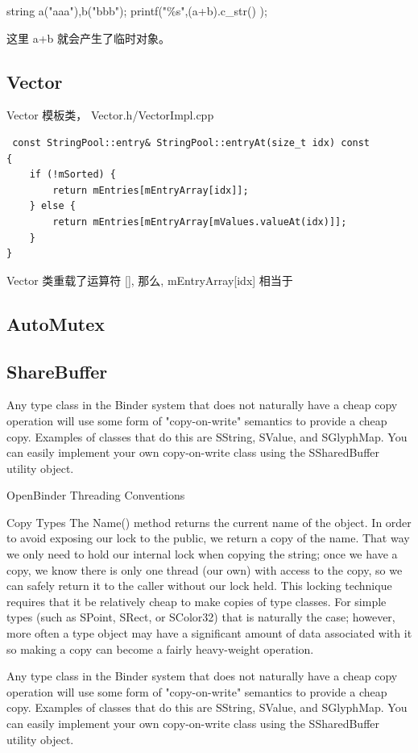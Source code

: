 \documentclass[a4paper,11pt]{article}
\begin{document}
 string a("aaa"),b("bbb");
 printf("\%s",(a+b).c_str() );

 这里 a+b 就会产生了临时对象。



\subsection{Vector}
Vector 模板类， Vector.h/VectorImpl.cpp
\begin{lstlisting}
 const StringPool::entry& StringPool::entryAt(size_t idx) const
{
    if (!mSorted) {
        return mEntries[mEntryArray[idx]];
    } else {
        return mEntries[mEntryArray[mValues.valueAt(idx)]];
    }
}
\end{lstlisting}

Vector 类重载了运算符 [], 那么,  mEntryArray[idx] 相当于 

\subsection{AutoMutex}

\subsection{ShareBuffer}
Any type class in the Binder system that does not naturally have a cheap copy operation will use some form of "copy-on-write" semantics to provide a cheap copy. Examples of classes that do this are SString, SValue, and SGlyphMap. You can easily implement your own copy-on-write class using the SSharedBuffer utility object.

OpenBinder
Threading Conventions


Copy Types
The Name() method returns the current name of the object. In order to avoid exposing our lock to the public, we return a copy of the name. That way we only need to hold our internal lock when copying the string; once we have a copy, we know there is only one thread (our own) with access to the copy, so we can safely return it to the caller without our lock held.
This locking technique requires that it be relatively cheap to make copies of type classes. For simple types (such as SPoint, SRect, or SColor32) that is naturally the case; however, more often a type object may have a significant amount of data associated with it so making a copy can become a fairly heavy-weight operation.

Any type class in the Binder system that does not naturally have a cheap copy operation will use some form of "copy-on-write" semantics to provide a cheap copy. Examples of classes that do this are SString, SValue, and SGlyphMap. You can easily implement your own copy-on-write class using the SSharedBuffer utility object.
\end{document}
